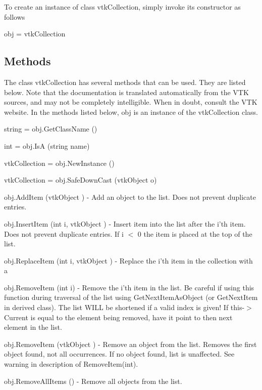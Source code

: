 To create an instance of class vtk\-Collection, simply invoke its constructor as follows \begin{DoxyVerb}  obj = vtkCollection
\end{DoxyVerb}
 \hypertarget{vtkwidgets_vtkxyplotwidget_Methods}{}\subsection{Methods}\label{vtkwidgets_vtkxyplotwidget_Methods}
The class vtk\-Collection has several methods that can be used. They are listed below. Note that the documentation is translated automatically from the V\-T\-K sources, and may not be completely intelligible. When in doubt, consult the V\-T\-K website. In the methods listed below, {\ttfamily obj} is an instance of the vtk\-Collection class. 
\begin{DoxyItemize}
\item {\ttfamily string = obj.\-Get\-Class\-Name ()}  
\item {\ttfamily int = obj.\-Is\-A (string name)}  
\item {\ttfamily vtk\-Collection = obj.\-New\-Instance ()}  
\item {\ttfamily vtk\-Collection = obj.\-Safe\-Down\-Cast (vtk\-Object o)}  
\item {\ttfamily obj.\-Add\-Item (vtk\-Object )} -\/ Add an object to the list. Does not prevent duplicate entries.  
\item {\ttfamily obj.\-Insert\-Item (int i, vtk\-Object )} -\/ Insert item into the list after the i'th item. Does not prevent duplicate entries. If i $<$ 0 the item is placed at the top of the list.  
\item {\ttfamily obj.\-Replace\-Item (int i, vtk\-Object )} -\/ Replace the i'th item in the collection with a  
\item {\ttfamily obj.\-Remove\-Item (int i)} -\/ Remove the i'th item in the list. Be careful if using this function during traversal of the list using Get\-Next\-Item\-As\-Object (or Get\-Next\-Item in derived class). The list W\-I\-L\-L be shortened if a valid index is given! If this-\/$>$Current is equal to the element being removed, have it point to then next element in the list.  
\item {\ttfamily obj.\-Remove\-Item (vtk\-Object )} -\/ Remove an object from the list. Removes the first object found, not all occurrences. If no object found, list is unaffected. See warning in description of Remove\-Item(int).  
\item {\ttfamily obj.\-Remove\-All\-Items ()} -\/ Remove all objects from the list.  

\end{DoxyItemize}

